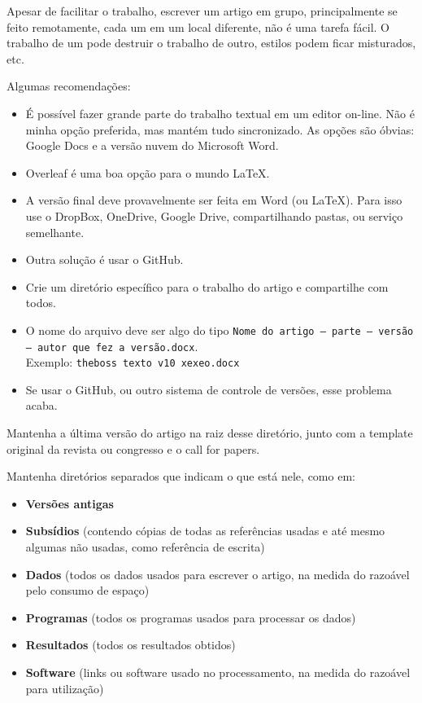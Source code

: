 Apesar de facilitar o trabalho, escrever um artigo em grupo, principalmente se feito remotamente, cada um em um local diferente, não é uma tarefa fácil. O trabalho de um pode destruir o trabalho de outro, estilos podem ficar misturados, etc.

Algumas recomendações:

\begin{itemize}
  \item É possível fazer grande parte do trabalho textual em um editor on-line. Não é minha opção preferida, mas mantém tudo sincronizado. As opções são óbvias: Google Docs e a versão nuvem do Microsoft Word. 
  \item Overleaf é uma boa opção para o mundo LaTeX.
  \item A versão final deve provavelmente ser feita em Word (ou LaTeX). Para isso use o DropBox, OneDrive, Google Drive, compartilhando pastas, ou serviço semelhante. 
  \item Outra solução é usar o GitHub.
  \item Crie um diretório específico para o trabalho do artigo e compartilhe com todos.
  \item O nome do arquivo deve ser algo do tipo \texttt{Nome do artigo – parte – versão – autor que fez a versão.docx}.\\
  Exemplo: \texttt{theboss texto v10 xexeo.docx}
  \item Se usar o GitHub, ou outro sistema de controle de versões, esse problema acaba.
\end{itemize}

Mantenha a última versão do artigo na raiz desse diretório, junto com a template original da revista ou congresso e o call for papers.

Mantenha diretórios separados que indicam o que está nele, como em:

\begin{itemize}
  \item \textbf{Versões antigas}
  \item \textbf{Subsídios} (contendo cópias de todas as referências usadas e até mesmo algumas não usadas, como referência de escrita)
  \item \textbf{Dados} (todos os dados usados para escrever o artigo, na medida do razoável pelo consumo de espaço)
  \item \textbf{Programas} (todos os programas usados para processar os dados)
  \item \textbf{Resultados} (todos os resultados obtidos)
  \item \textbf{Software} (links ou software usado no processamento, na medida do razoável para utilização)
\end{itemize}

